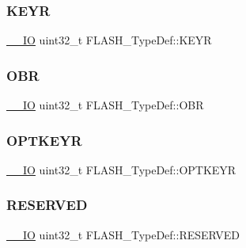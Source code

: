 \subsubsection{\texorpdfstring{KEYR}{KEYR}}
{\footnotesize\ttfamily \mbox{\hyperlink{group___c_m_s_i_s___c_m3__core__definitions_gaec43007d9998a0a0e01faede4133d6be}{\+\_\+\+\_\+\+IO}} uint32\+\_\+t F\+L\+A\+S\+H\+\_\+\+Type\+Def\+::\+K\+E\+YR}

\mbox{\label{struct_f_l_a_s_h___type_def_a24dece1e3b3185456afe34c3dc6add2e}} 
\subsubsection{\texorpdfstring{OBR}{OBR}}
{\footnotesize\ttfamily \mbox{\hyperlink{group___c_m_s_i_s___c_m3__core__definitions_gaec43007d9998a0a0e01faede4133d6be}{\+\_\+\+\_\+\+IO}} uint32\+\_\+t F\+L\+A\+S\+H\+\_\+\+Type\+Def\+::\+O\+BR}

\mbox{\label{struct_f_l_a_s_h___type_def_a793cd13a4636c9785fdb99316f7fd7ab}} 
\subsubsection{\texorpdfstring{OPTKEYR}{OPTKEYR}}
{\footnotesize\ttfamily \mbox{\hyperlink{group___c_m_s_i_s___c_m3__core__definitions_gaec43007d9998a0a0e01faede4133d6be}{\+\_\+\+\_\+\+IO}} uint32\+\_\+t F\+L\+A\+S\+H\+\_\+\+Type\+Def\+::\+O\+P\+T\+K\+E\+YR}

\mbox{\label{struct_f_l_a_s_h___type_def_a32e5cc660e711dc5424f827e2d4efd88}} 
\subsubsection{\texorpdfstring{RESERVED}{RESERVED}}
{\footnotesize\ttfamily \mbox{\hyperlink{group___c_m_s_i_s___c_m3__core__definitions_gaec43007d9998a0a0e01faede4133d6be}{\+\_\+\+\_\+\+IO}} uint32\+\_\+t F\+L\+A\+S\+H\+\_\+\+Type\+Def\+::\+R\+E\+S\+E\+R\+V\+ED}

